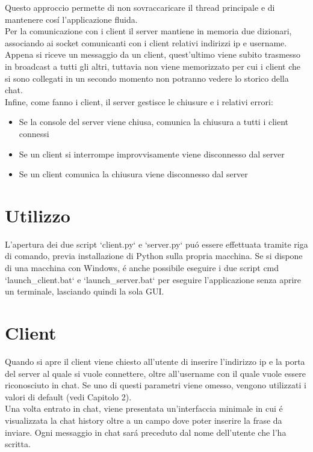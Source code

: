 \documentclass{article}
\begin{document}
Questo approccio permette di non sovraccaricare il thread principale e di mantenere cos\'{i} l'applicazione fluida.\\ 

Per la comunicazione con i client il server mantiene in memoria due dizionari, associando ai socket comunicanti con i client relativi indirizzi ip e username. 
Appena si riceve un messaggio da un client, quest'ultimo viene subito trasmesso in broadcast a tutti gli altri, tuttavia non viene memorizzato per cui i client 
che si sono collegati in un secondo momento non potranno vedere lo storico della chat.\\

Infine, come fanno i client, il server gestisce le chiusure e i relativi errori:
\begin{itemize}
  \item Se la console del server viene chiusa, comunica la chiusura a tutti i client connessi
  \item Se un client si interrompe improvvisamente viene disconnesso dal server
  \item Se un client comunica la chiusura viene disconnesso dal server
\end{itemize}

\newpage

\section{Utilizzo}

L'apertura dei due script `client.py` e `server.py` pu\'{o} essere effettuata tramite riga di comando, previa installazione di Python sulla propria macchina. 
Se si dispone di una macchina con Windows, \'{e} anche possibile eseguire i due script cmd `launch\_client.bat` e `launch\_server.bat` per eseguire l'applicazione senza aprire un terminale, lasciando quindi la sola GUI.

\section*{Client}

Quando si apre il client viene chiesto all'utente di inserire l'indirizzo ip e la porta del server al quale si vuole connettere, oltre all'username con il quale vuole essere riconosciuto in chat. 
Se uno di questi parametri viene omesso, vengono utilizzati i valori di default (vedi Capitolo 2).\\

Una volta entrato in chat, viene presentata un'interfaccia minimale in cui \'{e} visualizzata la chat history oltre a un campo dove poter inserire la frase da inviare. 
Ogni messaggio in chat sar\'{a} preceduto dal nome dell'utente che l'ha scritta.\\
\end{document}
